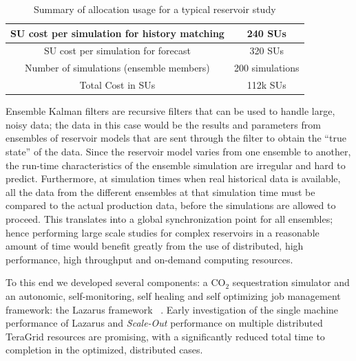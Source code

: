 \documentclass[a4paper,10pt]{article}
\begin{document}
\begin{table}[!h]
\begin{center}
 \caption{Summary of allocation usage for a typical reservoir study}
\begin{tabular}{| c | c |}
\hline
SU cost per simulation for history matching& 240 SUs \\ 
\hline
SU cost per simulation for forecast & 320 SUs \\ 
\hline
Number of simulations (ensemble members) & 200 simulations \\ 
\hline
Total Cost in SUs & 112k SUs\\
\hline
\end{tabular}
\end{center}
\end{table}

Ensemble Kalman filters are recursive filters that can be used to handle large, noisy data; the data in this case would be the results and parameters from ensembles of reservoir models that are sent through the filter to obtain the ``true state'' of the data. Since the reservoir model varies from one ensemble to another, the run-time characteristics of the ensemble simulation are irregular and hard to predict. Furthermore, at simulation times when real historical data is available, all the data from the different ensembles at that simulation time must be compared to the actual production data, before the simulations are allowed to proceed. This translates into a global synchronization point for all ensembles; hence performing large scale studies for complex reservoirs in a reasonable amount of time would benefit greatly from the use of distributed, high performance, high throughput and on-demand computing resources.


To this end we developed several components: a CO$_2$ sequestration simulator and an autonomic, self-monitoring, self healing and self optimizing job management framework: the Lazarus framework ~\cite{gmac}. Early investigation of the single machine performance of Lazarus and {\it Scale-Out} performance on multiple distributed TeraGrid resources are promising, with a significantly reduced total time to completion in the optimized, distributed cases.
\end{document}
